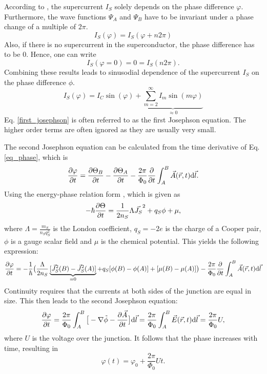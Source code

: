 \documentclass[a4paper,10pt]{article}
\newcommand{\dif}{\mathrm{d}}
\begin{document}
According to \cite{skriptum}, the supercurrent $I_S$ solely depends on the phase difference $\varphi$. Furthermore, the wave functions $\Psi_A$ and $\Psi_B$ have to be invariant under a phase change of a multiple of $2 \pi$. 
\begin{equation}
    I_S(\varphi) = I_S(\varphi + n 2 \pi)
\end{equation}
Also, if there is no supercurrent in the superconductor, the phase difference has to be $0$. Hence, one can write 
\begin{equation}
    I_S(\varphi = 0) = 0 = I_S( n 2 \pi).
\end{equation}
Combining these results leads to sinusodial dependence of the supercurrent $I_S$ on the phase difference $\phi$.
\begin{equation}
    I_S(\varphi) = I_C \sin(\varphi) + \underbrace{\sum^{\infty}_{m = 2} I_m \sin(m \varphi)}_{\approx 0}
    \label{first_josephson}
\end{equation}
Eq. \ref{first_josephson} is often referred to as the first Josephson equation. The higher order terms are often ignored as they are usually very small. 

The second Josephson equation can be calculated from the time derivative of Eq. \ref{eq_phase}, which is 
\begin{equation}
    \pdv{\varphi}{t} = \pdv{\Theta_B}{t} - \pdv{\Theta_A}{t} - \frac{2 \pi}{\Phi_0} \pdv{}{t} \int^B_A \vec{A}(\vec{r},t) \dif \vec{l}.
\end{equation}
Using the energy-phase relation form \cite{grossmarx}, which is given as 
\begin{equation}
    -\hbar \pdv{\Theta}{t} = \frac{1}{2 n_S} \Lambda \vec{J_S}^2 + q_S \phi + \mu,
\end{equation}
where $\Lambda = \frac{m_S}{n_S q_S^2}$ is the London coefficient, $q_S = -2 e$ is the charge of a Cooper pair, $\phi$ is a gauge scalar field and $\mu$ is the chemical potential. This yields the following expression:
\begin{equation}
    \pdv{\varphi}{t} = - \frac{1}{\hbar} \big( \frac{\Lambda}{2 n_S} \underbrace{[\vec{J}_S^2(B) - \vec{J}_S^2(A)]}_{ = 0} + q_S [\phi(B) - \phi(A)] + [\mu(B) - \mu(A)] \big) -  \frac{2 \pi}{\Phi_0} \pdv{}{t} \int^B_A \vec{A}(\vec{r},t) \dif \vec{l}
\end{equation}
Continuity requires that the currents at both sides of the junction are equal in size. This then leads to the second Josephson equation:
\begin{equation}
\pdv{\varphi}{t} = \frac{2 \pi}{\Phi_0} \int^B_A \big[ - \nabla \tilde{\phi} - \pdv{\vec{A}}{t} \big] \dif \vec{l} = \frac{2 \pi}{\Phi_0} \int^B_A \vec{E}(\vec{r},t) \dif \vec{l} = \frac{2 \pi}{\Phi_0} U,
\end{equation}
where $U$ is the voltage over the junction. It follows that the phase increases with time, resulting in 
\begin{equation}
    \varphi(t) = \varphi_0 + \frac{2 \pi}{\Phi_0} U t.
    \label{eq_josephson_2}
\end{equation}
\end{document}
